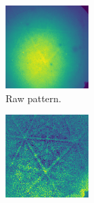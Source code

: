 \documentclass[11pt, twoside]{article}
\begin{document}
\begin{figure}[tb]
  \begin{subfigure}[t]{0.33\columnwidth}
    \includegraphics[width=1\columnwidth]{figurer/ebsp/ebsp_2_4.png}
    \caption{Raw pattern.}
    \label{fig:ebsp-raw}
  \end{subfigure}
  \begin{subfigure}[t]{0.33\columnwidth}
    \includegraphics[width=1\columnwidth]{figurer/ebsp/ebsp_2_4_s.png}

\end{subfigure}
\end{figure}
\end{document}
